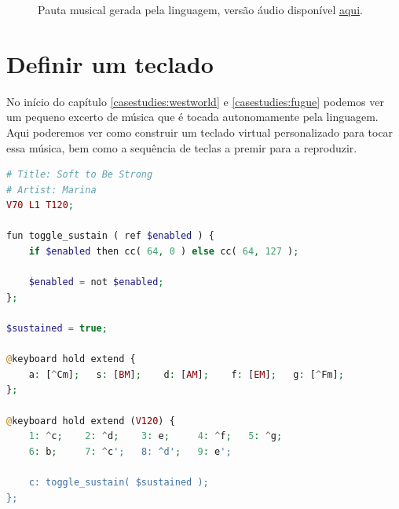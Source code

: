\begin{figure}[ht]
  \centering
  {%
  \setlength{\fboxsep}{0pt}%
  \setlength{\fboxrule}{0pt}%
  }%
  \caption{Pauta musical gerada pela linguagem, versão áudio disponível \href{https://drive.google.com/file/d/1dIfvnhhKn73Vpp0W6ss6RLsv6PQ_HFTF/view}{\underline{aqui}}\protect\footnotemark.}
  \label{fig:fugue}
\end{figure}



\section{Definir um teclado}
No início do capítulo \ref{casestudies:westworld} e \ref{casestudies:fugue} podemos ver um pequeno excerto de música que é tocada autonomamente pela linguagem. Aqui poderemos ver como construir um teclado virtual personalizado para tocar essa música, bem como a sequência de teclas a premir para a reproduzir.
    
\begin{lstlisting}[caption=Exemplo da sintaxe para criação de teclados,language=PHP]
# Title: Soft to Be Strong
# Artist: Marina
V70 L1 T120;

fun toggle_sustain ( ref $enabled ) {
    if $enabled then cc( 64, 0 ) else cc( 64, 127 );

    $enabled = not $enabled;
};

$sustained = true;

@keyboard hold extend {
    a: [^Cm];   s: [BM];    d: [AM];    f: [EM];   g: [^Fm];
};

@keyboard hold extend (V120) {
    1: ^c;    2: ^d;    3: e;     4: ^f;   5: ^g;
    6: b;     7: ^c';   8: ^d';   9: e';

    c: toggle_sustain( $sustained );
};
\end{lstlisting}


